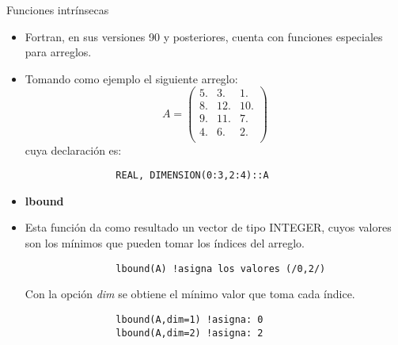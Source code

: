 \begin{frame}[fragile]{Funciones intrínsecas} 
    \begin{itemize}[<+(0)->]
        \item Fortran, en sus versiones 90 y posteriores, cuenta con funciones especiales para arreglos.
        \item [] Tomando como ejemplo el siguiente arreglo:
            $$
                A = \left( \begin{array}{ccc}
                    5.      &  3.   &  1.  \\
                    8.      & 12.   & 10.  \\
                    9.      & 11.   &  7.  \\
                    4.      &  6.   &  2.  \\
                \end{array} \right)
            $$
            cuya declaración es: \\ 
            \vspace{0.15cm}
            \begin{verbatim}
                REAL, DIMENSION(0:3,2:4)::A
            \end{verbatim}
        \item [] \textbf{lbound} 
        \item Esta función da como resultado un vector de tipo INTEGER, cuyos valores son los mínimos que pueden tomar los índices del arreglo.
            \begin{verbatim}
                lbound(A) !asigna los valores (/0,2/)
            \end{verbatim}
            Con la opción \emph{dim} se obtiene el mínimo valor que toma cada índice.
            \begin{verbatim}
                lbound(A,dim=1) !asigna: 0
                lbound(A,dim=2) !asigna: 2
            \end{verbatim}
    \end{itemize}
\end{frame}